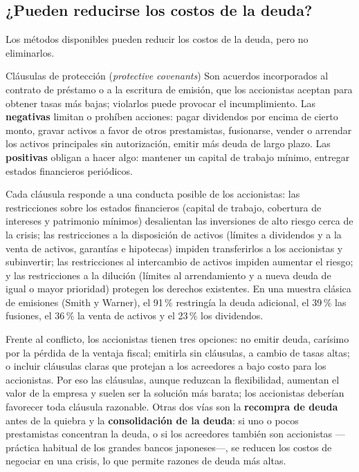 \subsection{¿Pueden reducirse los costos de la deuda?}

Los métodos disponibles pueden reducir los costos de la deuda, pero no eliminarlos.

\begin{definicion}{Cláusulas de protección (\emph{protective covenants})}
Son acuerdos incorporados al contrato de préstamo o a la escritura de emisión, que los accionistas aceptan para obtener tasas más bajas; violarlos puede provocar el incumplimiento. Las \textbf{negativas} limitan o prohíben acciones: pagar dividendos por encima de cierto monto, gravar activos a favor de otros prestamistas, fusionarse, vender o arrendar los activos principales sin autorización, emitir más deuda de largo plazo. Las \textbf{positivas} obligan a hacer algo: mantener un capital de trabajo mínimo, entregar estados financieros periódicos.
\end{definicion}

Cada cláusula responde a una conducta posible de los accionistas: las restricciones sobre los estados financieros (capital de trabajo, cobertura de intereses y patrimonio mínimos) desalientan las inversiones de alto riesgo cerca de la crisis; las restricciones a la disposición de activos (límites a dividendos y a la venta de activos, garantías e hipotecas) impiden transferirlos a los accionistas y subinvertir; las restricciones al intercambio de activos impiden aumentar el riesgo; y las restricciones a la dilución (límites al arrendamiento y a nueva deuda de igual o mayor prioridad) protegen los derechos existentes. En una muestra clásica de emisiones (Smith y Warner), el 91\,\% restringía la deuda adicional, el 39\,\% las fusiones, el 36\,\% la venta de activos y el 23\,\% los dividendos.

Frente al conflicto, los accionistas tienen tres opciones: no emitir deuda, carísimo por la pérdida de la ventaja fiscal; emitirla sin cláusulas, a cambio de tasas altas; o incluir cláusulas claras que protejan a los acreedores a bajo costo para los accionistas. Por eso las cláusulas, aunque reduzcan la flexibilidad, aumentan el valor de la empresa y suelen ser la solución más barata; los accionistas deberían favorecer toda cláusula razonable. Otras dos vías son la \textbf{recompra de deuda} antes de la quiebra y la \textbf{consolidación de la deuda}: si uno o pocos prestamistas concentran la deuda, o si los acreedores también son accionistas —práctica habitual de los grandes bancos japoneses—, se reducen los costos de negociar en una crisis, lo que permite razones de deuda más altas.

